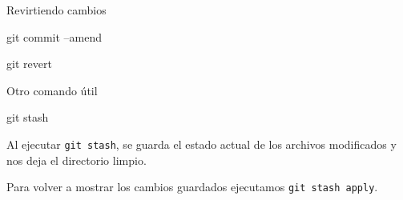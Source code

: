 \begin{frame}[t]{Revirtiendo cambios}
    \begin{comando}
        git commit --amend
    \end{comando}


    \vspace{2em}

    \begin{comando}
        git revert
    \end{comando}

\end{frame}

\begin{frame}[t]{Otro comando útil}
    \begin{comando}
        git stash
    \end{comando}

    \pause
    \begin{block}{}
        Al ejecutar \texttt{git stash}, se guarda el estado actual de los archivos modificados y nos deja el directorio limpio.

        \vspace{0.5em}

        Para volver a mostrar los cambios guardados ejecutamos \texttt{git stash apply}.
    \end{block}
\end{frame}

